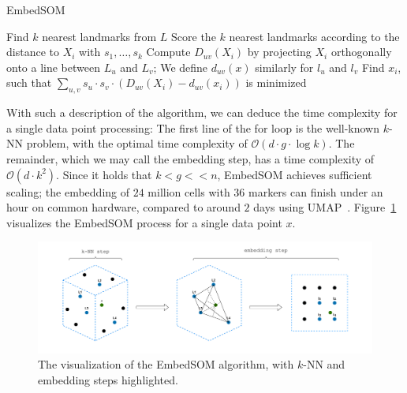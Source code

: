 \begin{algorithm}[t]
    \caption{EmbedSOM}
    \label{alg01:esom}
    \begin{algorithmic}[1]
         
            \State Find $k$ nearest landmarks from $L$
            \State Score the $k$ nearest landmarks according to the distance to $X_i$ with $s_1, \dots, s_k$
             
                \State Compute $D_{uv}(X_i)$ by projecting $X_i$ orthogonally onto a line between $L_u$ and $L_v$; We define $d_{uv}(x)$ similarly for $l_u$ and $l_v$
            \EndFor
            \State Find $x_i$, such that $\sum_{u, v} s_u \cdot s_v \cdot (D_{uv}(X_i) - d_{uv}(x_i))$ is minimized
        \EndFor
        \EndProcedure
    \end{algorithmic}
\end{algorithm}

With such a description of the algorithm, we can deduce the time complexity for a single data point processing: The first line of the for loop is the well-known $k$-NN problem, with the optimal time complexity of $\mathcal{O}(d \cdot g \cdot \log k)$. The remainder, which we may call the embedding step, has a time complexity of $\mathcal{O}(d \cdot k^2)$. Since it holds that $k < g << n$, EmbedSOM achieves sufficient scaling; the embedding of $24$ million cells with $36$ markers can finish under an hour on common hardware, compared to around $2$ days using UMAP~\cite{kratochvil2019som}. Figure~\ref{fig:embedsom} visualizes the EmbedSOM process for a single data point $x$.

\begin{figure}[h]
    \centering
    \includegraphics[width=\textwidth]{img/embedsom.drawio.pdf}
    \caption{The visualization of the EmbedSOM algorithm, with $k$-NN and embedding steps highlighted.}
    \label{fig:embedsom}
\end{figure}

